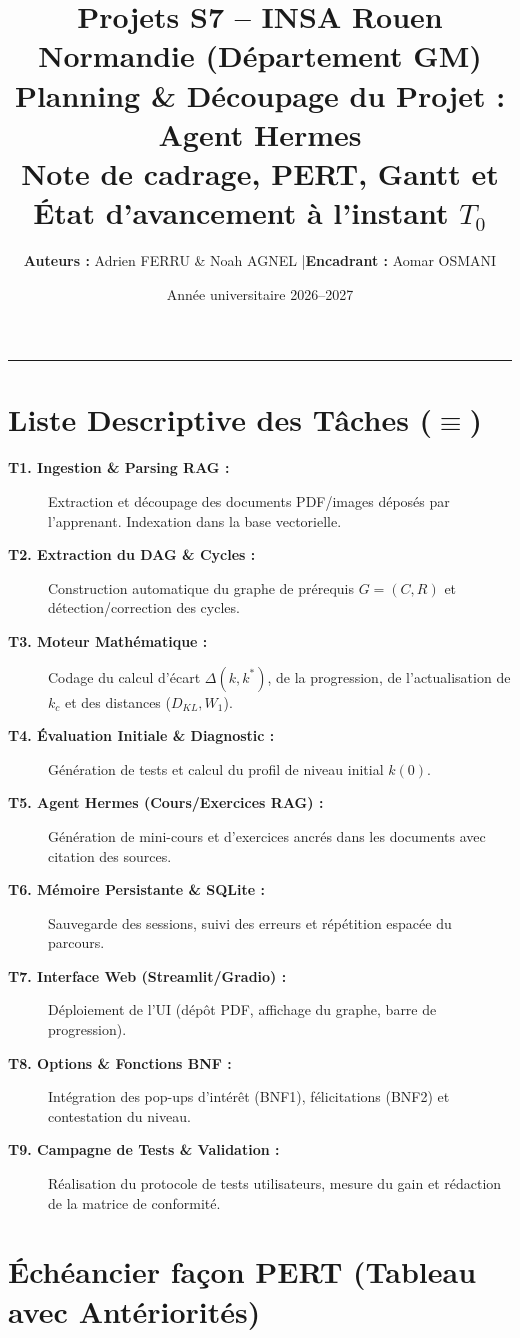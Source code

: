 \documentclass[11pt, a4paper]{article}
\title{\textbf{\Large Projets S7 -- INSA Rouen Normandie (Département GM)}\\[0.3em]
\Huge \textbf{\color{primary} Planning \& Découpage du Projet : Agent Hermes}\\[0.2em]
\large Note de cadrage, PERT, Gantt et État d'avancement à l'instant $T_0$}
\author{\textbf{Auteurs :} Adrien FERRU \& Noah AGNEL \quad|\quad \textbf{Encadrant :} Aomar OSMANI}
\date{Année universitaire 2026--2027}
\begin{document}
\maketitle
\hrule
\vspace{0.8em}

\section{Liste Descriptive des Tâches ($\equiv$)}

\begin{description}
    \item[\textbf{T1. Ingestion \& Parsing RAG :}] Extraction et découpage des documents PDF/images déposés par l'apprenant. Indexation dans la base vectorielle.
    \item[\textbf{T2. Extraction du DAG \& Cycles :}] Construction automatique du graphe de prérequis $G=(C,R)$ et détection/correction des cycles.
    \item[\textbf{T3. Moteur Mathématique :}] Codage du calcul d'écart $\Delta(k,k^*)$, de la progression, de l'actualisation de $k_c$ et des distances ($D_{KL}, W_1$).
    \item[\textbf{T4. Évaluation Initiale \& Diagnostic :}] Génération de tests et calcul du profil de niveau initial $k(0)$.
    \item[\textbf{T5. Agent Hermes (Cours/Exercices RAG) :}] Génération de mini-cours et d'exercices ancrés dans les documents avec citation des sources.
    \item[\textbf{T6. Mémoire Persistante \& SQLite :}] Sauvegarde des sessions, suivi des erreurs et répétition espacée du parcours.
    \item[\textbf{T7. Interface Web (Streamlit/Gradio) :}] Déploiement de l'UI (dépôt PDF, affichage du graphe, barre de progression).
    \item[\textbf{T8. Options \& Fonctions BNF :}] Intégration des pop-ups d'intérêt (BNF1), félicitations (BNF2) et contestation du niveau.
    \item[\textbf{T9. Campagne de Tests \& Validation :}] Réalisation du protocole de tests utilisateurs, mesure du gain et rédaction de la matrice de conformité.
\end{description}

\section{Échéancier façon PERT (Tableau avec Antériorités)}
\end{document}
